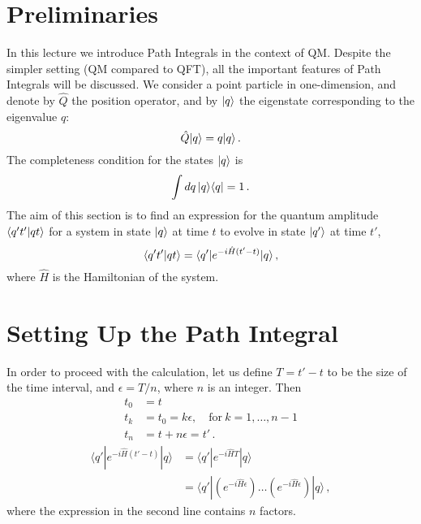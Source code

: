 \newcommand{\epsstep}{\left(e^{-i \hat{H} \epsilon}\right)}

\section{Preliminaries}
\label{sec:preliminaries-1}

In this lecture we introduce Path Integrals in the context of
QM. Despite the simpler setting (QM compared to QFT), all the
important features of Path Integrals will be discussed. We consider a
point particle in one-dimension, and denote by $\hat{Q}$ the position
operator, and by $| q \rangle$ the eigenstate corresponding to the eigenvalue
$q$:
\begin{equation}
  \label{eq:QEigen}
  \hat{Q} | q \rangle = q | q \rangle\, .
\end{equation}
The completeness condition for the states $| q \rangle$ is
\begin{equation}
  \label{eq:qComplete}
  \int dq\, | q \rangle\langle q | = 1\, .
\end{equation}
The aim of this section is to find an expression for the quantum
amplitude $\langle q't' | qt \rangle$ for a system in state $| q \rangle$ at time
$t$ to evolve in state $| q' \rangle$ at time $t'$,
\begin{equation}
  \label{eq:AmplitudeDef}
  \langle q't' | qt \rangle = \langle q' | e^{-i \hat{H} (t'-t)}|q\rangle\, ,
\end{equation}
where $\hat{H}$ is the Hamiltonian of the system. 

\section{Setting Up the Path Integral}
\label{sec:setting-up-path}

In order to proceed with the calculation, let us define $T=t'-t$ to be
the size of the time interval, and $\epsilon=T/n$, where $n$ is an
integer. Then 
\begin{align}
  t_0 &= t \\
  t_k &= t_0 = k \epsilon, \quad \text{for}\ k=1, \ldots, n-1 \\
  t_n &= t + n \epsilon = t'\, .
\end{align}
\begin{align}
  \langle q' | e^{-i \hat{H} (t'-t)}|q\rangle &= 
                 \langle q' | e^{-i \hat{H} T} | q\rangle \\
               &= \langle q' | \left(e^{-i \hat{H} \epsilon}\right)
                 \ldots \left(e^{-i \hat{H} \epsilon}\right) |
                 q\rangle\, ,
\end{align}
where the expression in the second line contains $n$ factors. 

